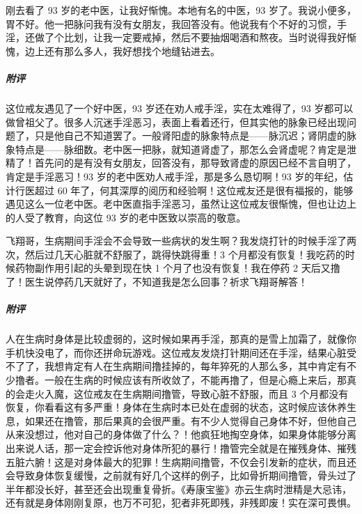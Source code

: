 \begin{case}
    刚去看了 93 岁的老中医，让我好惭愧。本地有名的中医，93 岁了。我说小便多，胃不好。他一把脉问我有没有女朋友，我回答没有。他说我有个不好的习惯，手淫，还做了个比划，让我一定要戒掉，然后不要抽烟喝酒和熬夜。当时说得我好惭愧，边上还有那么多人，我好想找个地缝钻进去。
    \subparagraph{附评} 这位戒友遇见了一个好中医，93 岁还在劝人戒手淫，实在太难得了，93 岁都可以做曾祖父了。很多人沉迷手淫恶习，表面上看着还行，但其实他的脉象已经出现问题了，只是他自己不知道罢了。一般肾阳虚的脉象特点是——脉沉迟；肾阴虚的脉象特点是——脉细数。老中医一把脉，就知道肾虚了，那怎么会肾虚呢？肯定是泄精了！首先问的是有没有女朋友，回答没有，那导致肾虚的原因已经不言自明了，肯定是手淫恶习！93 岁的老中医劝人戒手淫，那是多么恳切啊！93 岁的年纪，估计行医超过 60 年了，何其深厚的阅历和经验啊！这位戒友还是很有福报的，能够遇见这么一位老中医。老中医直指手淫恶习，虽然让这位戒友很惭愧，但也让边上的人受了教育，向这位 93 岁的老中医致以崇高的敬意。
\end{case}

\begin{case}
    飞翔哥，生病期间手淫会不会导致一些病状的发生啊？我发烧打针的时候手淫了两次，然后过几天心脏就不舒服了，跳得快跳得重！3 个月都没有恢复！我吃药的时候药物副作用引起的头晕到现在快 1 个月了也没有恢复！我在停药 2 天后又撸了！医生说停药几天就好了，不知道我是怎么回事？祈求飞翔哥解答！
    \subparagraph{附评} 人在生病时身体是比较虚弱的，这时候如果再手淫，那真的是雪上加霜了，就像你手机快没电了，而你还拼命玩游戏。这位戒友发烧打针期间还在手淫，结果心脏受不了了，我想肯定有人在生病期间撸挂掉的，每年猝死的人那么多，其中肯定有不少撸者。一般在生病的时候应该有所收敛了，不能再撸了，但是心瘾上来后，那真的会走火入魔，这位戒友在生病期间撸管，导致心脏不舒服，而且 3 个月都没有恢复，你看看这有多严重！身体在生病时本已处在虚弱的状态，这时候应该休养生息，如果还在撸管，那后果真的会很严重。有不少人觉得自己身体不好，但他自己从来没想过，他对自己的身体做了什么？！他疯狂地掏空身体，如果身体能够分离出来说人话，那一定会控诉他对身体所犯的暴行！撸管完全就是在摧残身体、摧残五脏六腑！这是对身体最大的犯罪！生病期间撸管，不仅会引发新的症状，而且还会导致身体恢复缓慢，之前就有好几个这样的例子，比如骨折期间撸管，骨头过了半年都没长好，甚至还会出现重复骨折。《寿康宝鉴》亦云生病时泄精是大忌讳，还有就是身体刚刚复原，也万不可犯，犯者非死即残，非残即废！实在深可畏惧。
\end{case}

